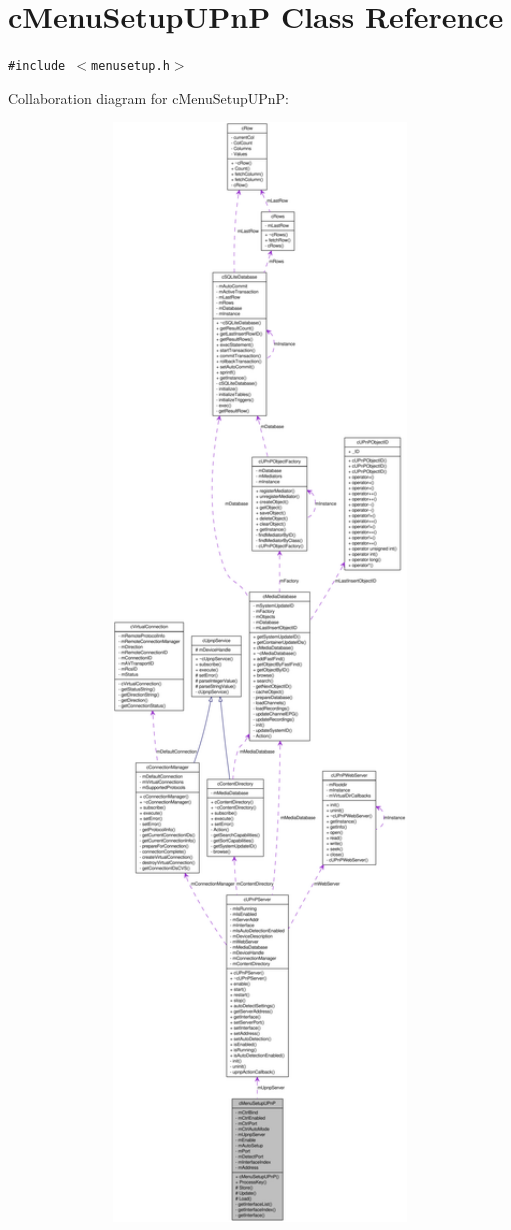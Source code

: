\hypertarget{classcMenuSetupUPnP}{
\section{cMenuSetupUPnP Class Reference}
\label{classcMenuSetupUPnP}
}
{\tt \#include $<$menusetup.h$>$}

Collaboration diagram for cMenuSetupUPnP:\nopagebreak
\begin{figure}[H]
\begin{center}
\leavevmode
\includegraphics[width=400pt]{classcMenuSetupUPnP__coll__graph}
\end{center}
\end{figure}
